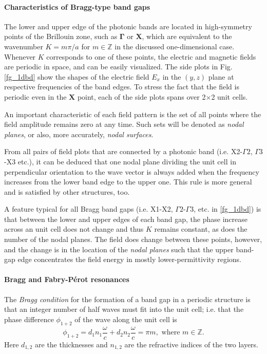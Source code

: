 \paragraph{Characteristics of Bragg-type band gaps}%
The lower and upper edge of the photonic bands are located in high-symmetry points of the Brillouin zone, such as $\mathbf{\Gamma}$ or $\mathbf{X}$, which are equivalent to the wavenumber $K=m\pi/a$ for $m\in\mathbb{Z}$ in the discussed one-dimensional case. Whenever $K$ corresponds to one of these points, the electric and magnetic fields are periodic in space, and can be easily visualized. The side plots in Fig. \ref{fg_1dbd} show the shapes of the electric field $E_x$ in the $(y,z)$ plane at respective frequencies of the band edges. To stress the fact that the field is periodic even in the $\mathbf{X}$ point, each of the side plots spans over 2$\times$2 unit cells. 

An important characteristic of each field pattern is the set of all points where the field amplitude remains zero at any time. Such sets will be denoted as \textit{nodal planes}, or also, more accurately, \textit{nodal surfaces}.

From all pairs of field plots that are connected by a photonic band (i.e. X2-$\Gamma2$, $\Gamma3$-X3 etc.), it can be deduced that one nodal plane dividing the unit cell in perpendicular orientation to the wave vector is always added when the frequency increases from the lower band edge to the upper one. This rule is more general and is satisfied by other structures, too. 

A feature typical for all Bragg band gaps (i.e. X1-X2, $\Gamma2$-$\Gamma3$, etc. in \ref{fg_1dbd}) is that between the lower and upper edges of each band gap, the phase increase across an unit cell does not change and thus $K$ remains constant, as does the number of the nodal planes. The field does change between these points, however, and the change is in the location of the \textit{nodal planes} such that the upper band-gap edge concentrates the field energy in mostly lower-permittivity regions. 

\paragraph{Bragg and Fabry-Pérot resonances} %
The \textit{Bragg condition} for the formation of a band gap in a periodic structure is that an integer number of half waves must fit into the unit cell; i.e. that the phase difference $\phi_{1+2}$ of the wave along the unit cell is 
\begin{equation} \phi_{1+2} = d_1 n_1 \frac{\omega}{c} + d_2 n_2 \frac{\omega}{c} = \pi m, \text{ where } m\in \mathbb{Z}. \label{eq_braggcond}\end{equation}
Here $d_{1,2}$ are the thicknesses and $n_{1,2}$ are the refractive indices of the two layers.

